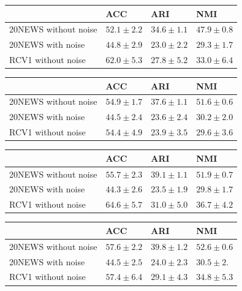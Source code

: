 \begin{table}[h]
  \begin{tabular}{|l|l|l|l|}
    \hline
    & ACC          &ARI           & NMI           \\ \hline
    20NEWS without noise   &$52.1 \pm 2.2$&$34.6 \pm 1.1$&$47.9 \pm 0.8$ \\ \hline
    20NEWS with noise      &$44.8 \pm 2.9$&$23.0 \pm 2.2$ &$29.3 \pm 1.7$ \\ \hline
    RCV1 without noise     &$62.0 \pm 5.3$&$27.8 \pm 5.2$&$33.0 \pm 6.4$ \\ \hline
  \end{tabular}
  \begin{tabular}{|l|l|l|l|}
    \hline
    & ACC          &ARI          & NMI          \\ \hline
    20NEWS without noise    & $54.9\pm 1.7$&$37.6\pm 1.1$&$51.6\pm 0.6$ \\ \hline
    20NEWS with noise       & $44.5\pm 2.4$&$23.6\pm 2.4$&$30.2\pm 2.0$ \\ \hline
    RCV1 without noise      &$54.4\pm 4.9$ &$23.9\pm 3.5$&$29.6\pm 3.6$ \\ \hline
  \end{tabular}
  \begin{tabular}{|l|l|l|l|}
    \hline
    & ACC                  &ARI                   & NMI                   \\ \hline
    20NEWS without noise   &$55.7\pm 2.3$  &$39.1\pm 1.1$    &$51.9\pm 0.7$ \\ \hline
    20NEWS with noise      &$44.3\pm 2.6$  &$23.5\pm 1.9$&$29.8\pm 1.7$ \\ \hline
    RCV1 without noise     &\boldmath$64.6\pm 5.7$&\boldmath$31.0\pm 5.0$&\boldmath$36.7 \pm 4.2$  \\ \hline
  \end{tabular}
  \begin{tabular}{|l|l|l|l|}
    \hline
    & ACC                  &ARI                   & NMI                   \\ \hline
    20NEWS without noise   &$57.6\pm 2.2$  &$39.8\pm 1.2$    &$52.6\pm 0.6$ \\ \hline
    20NEWS with noise      &$44.5\pm 2.5$  &$24.0\pm 2.3$&\boldmath$30.5\pm 2.$ \\ \hline
    RCV1 without noise     &$57.4\pm 6.4$&$29.1\pm 4.3$&$34.8 \pm 5.3$  \\ \hline

\end{tabular}
\end{table}
